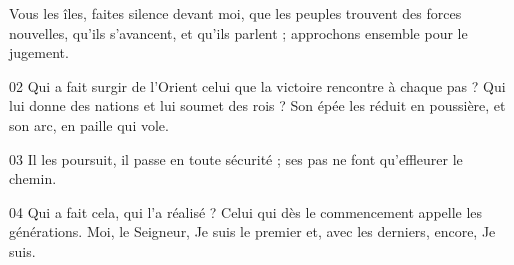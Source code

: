 Vous les îles, faites silence devant moi, que les peuples trouvent des forces nouvelles, qu’ils s’avancent, et qu’ils parlent ; approchons ensemble pour le jugement.

02 Qui a fait surgir de l’Orient celui que la victoire rencontre à chaque pas ? Qui lui donne des nations et lui soumet des rois ? Son épée les réduit en poussière, et son arc, en paille qui vole.

03 Il les poursuit, il passe en toute sécurité ; ses pas ne font qu’effleurer le chemin.

04 Qui a fait cela, qui l’a réalisé ? Celui qui dès le commencement appelle les générations. Moi, le Seigneur, Je suis le premier et, avec les derniers, encore, Je suis.